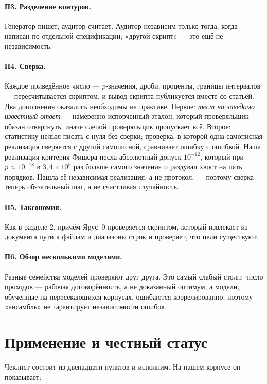 \documentclass[11pt]{article}
\begin{document}
\paragraph{П3. Разделение контуров.} Генератор пишет, аудитор считает. Аудитор
независим только тогда, когда написан по отдельной спецификации; «другой
скрипт» — это ещё не независимость.

\paragraph{П4. Сверка.} Каждое приведённое число — $p$-значения, дроби,
проценты, границы интервалов — пересчитывается скриптом, и вывод скрипта
публикуется вместе со статьёй. Два дополнения оказались необходимы на
практике. Первое: \emph{тест на заведомо известный ответ} — намеренно
испорченный эталон, который проверяльщик обязан отвергнуть, иначе слепой
проверяльщик пропускает всё. Второе: статистику нельзя писать с нуля без
сверки; проверка, в которой одна самописная реализация сверяется с другой
самописной, сравнивает ошибку с ошибкой. Наша реализация критерия Фишера несла
абсолютный допуск $10^{-12}$, который при $p \approx 10^{-18}$ в
$3{,}4\times10^{5}$ раз больше самого значения и раздувал хвост на пять
порядков. Нашла её независимая реализация, а не протокол, — поэтому сверка
теперь обязательный шаг, а не счастливая случайность.

\paragraph{П5. Таксономия.} Как в разделе 2, причём Ярус~0 проверяется
скриптом, который извлекает из документа пути к файлам и диапазоны строк и
проверяет, что цели существуют.

\paragraph{П6. Обзор несколькими моделями.} Разные семейства моделей проверяют
друг друга. Это самый слабый столп: число проходов — рабочая договорённость, а
не доказанный оптимум, а модели, обученные на пересекающихся корпусах,
ошибаются коррелированно, поэтому «ансамбль» не гарантирует независимости
ошибок.

\section{Применение и честный статус}
\label{sec:status}

Чеклист состоит из двенадцати пунктов и исполним. На нашем корпусе он
показывает:
\end{document}
